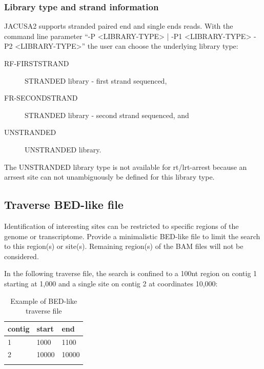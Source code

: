 \documentclass[10pt,a4paper]{article}
\begin{document}
\subsubsection{Library type and strand information}
JACUSA2 supports stranded paired end and single ends reads. With the command line parameter 
``-P <LIBRARY-TYPE> | -P1 <LIBRARY-TYPE> -P2 <LIBRARY-TYPE>'' the user can choose the underlying library type:
\begin{description} 
\item[RF-FIRSTSTRAND] STRANDED library - first strand sequenced,
\item[FR-SECONDSTRAND] STRANDED library - second strand sequenced, and
\item[UNSTRANDED] UNSTRANDED library.
\end{description}
The UNSTRANDED library type is not available for rt/lrt-arrest because an arrsest site can not unambiguously be  
defined for this library type.
\subsection{Traverse BED-like file}
Identification of interesting sites can be restricted to specific regions of the genome or transcriptome. 
Provide a minimalistic BED-like file to limit the search to this region(s) or site(s). 
Remaining region(s) of the BAM files will not be considered.

In the following traverse file, the search is confined to a 100nt region on contig 1
starting at 1,000 and a single site on contig 2 at coordinates 10,000:
\begin{table}
\centering
\caption{Example of BED-like traverse file}
\label{tb:traverse_file}
\begin{tabular}{lll}
\textbf{contig} & \textbf{start} & \textbf{end} \\
\hline
1 & 1000 & 1100 \\
2 & 10000 & 10000 \\
\multicolumn{3}{c}{}
\end{tabular}
\end{table}
\end{document}
